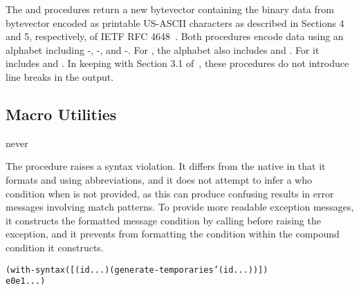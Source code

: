 The  and 
procedures return a new byte\-vector containing the binary data from bytevector
 encoded as printable US-ASCII characters as described in Sections 4
and 5, respectively, of IETF RFC 4648~\cite{rfc4648}.
Both procedures encode data using an alphabet including -,
-, and -.
For , the alphabet also includes \code{+} and \code{/}.
For  it includes \code{-} and \code{\_}.
In keeping with Section 3.1 of~\cite{rfc4648}, these procedures
do not introduce line breaks in the output.

\subsection{Macro Utilities}

\begin{procedure}
\end{procedure}
\returns{} never

The  procedure raises a syntax violation.
It differs from the native  in that it formats
 and  using  abbreviations,
and it does not attempt to infer a who condition when  is not
provided, as this can produce confusing results in error messages
involving match patterns.
To provide more readable exception messages, it constructs the formatted
message condition by calling  before raising the exception,
and it prevents  from formatting the 
condition within the compound condition it constructs.

\begin{syntax}
\end{syntax}
\expandsto{}\begin{alltt}\antipar
(with-syntax ([(id ...) (generate-temporaries '(id ...))])
  e0 e1 ...)\end{alltt}

